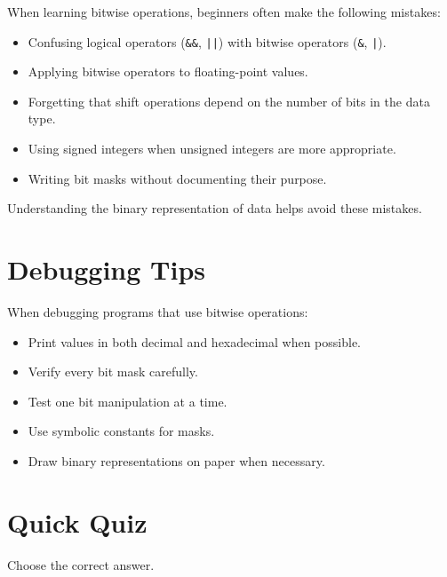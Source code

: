 \documentclass[12pt,openany]{book}
\begin{document}
When learning bitwise operations, beginners often make the following mistakes:

\begin{itemize}
    \item Confusing logical operators (\texttt{\&\&}, \texttt{||}) with bitwise operators (\texttt{\&}, \texttt{|}).
    \item Applying bitwise operators to floating-point values.
    \item Forgetting that shift operations depend on the number of bits in the data type.
    \item Using signed integers when unsigned integers are more appropriate.
    \item Writing bit masks without documenting their purpose.
\end{itemize}

Understanding the binary representation of data helps avoid these mistakes.

\section{Debugging Tips}

When debugging programs that use bitwise operations:

\begin{itemize}
    \item Print values in both decimal and hexadecimal when possible.
    \item Verify every bit mask carefully.
    \item Test one bit manipulation at a time.
    \item Use symbolic constants for masks.
    \item Draw binary representations on paper when necessary.
\end{itemize}

\section{Quick Quiz}

Choose the correct answer.
\end{document}
